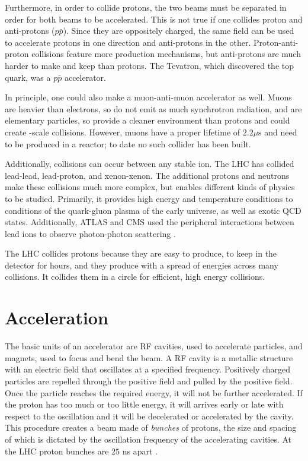 Furthermore, in order to collide protons, the two beams must be separated in order for both beams to be accelerated. This is not true if one collides proton and anti-protons ($p\bar{p}$). Since they are oppositely charged, the same field can be used to accelerate protons in one direction and anti-protons in the other. Proton-anti-proton collisions feature more production mechanisms, but anti-protons are much harder to make and keep than protons. The Tevatron, which discovered the top quark, was a $p\bar{p}$ accelerator. 

In principle, one could also make a muon-anti-muon accelerator as well. Muons are heavier than electrons, so do not emit as much synchrotron radiation, and are elementary particles, so provide a cleaner environment than protons and could create \TeV-scale collisions. However, muons have a proper lifetime of $2.2 \mu\textrm{s}$ and need to be produced in a reactor; to date no such collider has been built. 

Additionally, collisions can occur between any stable ion. The \ac{LHC} has collided lead-lead, lead-proton, and xenon-xenon. The additional protons and neutrons make these collisions much more complex, but enables different kinds of physics to be studied. Primarily, it provides high energy and temperature conditions to conditions of the quark-gluon plasma of the early universe, as well as exotic \ac{QCD} states. Additionally, \ac{ATLAS} and \ac{CMS} used the peripheral interactions between lead ions to observe photon-photon scattering \cite{light-light-scattering}.

The \ac{LHC} collides protons because they are easy to produce, to keep in the detector for hours, and they produce with a spread of energies across many collisions. It collides them in a circle for efficient, high energy collisions. 

\section{Acceleration}
The basic units of an accelerator are \ac{RF} cavities, used to accelerate particles, and magnets, used to focus and bend the beam. A \ac{RF} cavity is a metallic structure with an electric field that oscillates at a specified frequency. Positively charged particles are repelled through the positive field and pulled by the positive field. Once the particle reaches the required energy, it will not be further accelerated. If the proton has too much or too little energy, it will arrives early or late with respect to the oscillation and it will be decelerated or accelerated by the cavity. This procedure creates a beam made of \emph{bunches} of protons, the size and spacing of which is dictated by the oscillation frequency of the accelerating cavities. At the \ac{LHC} proton bunches are $25$ ns apart \cite{cern-cavities}. 

